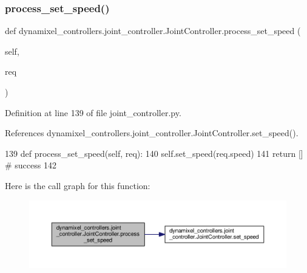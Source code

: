 \subsubsection{\texorpdfstring{process\+\_\+set\+\_\+speed()}{process\_set\_speed()}}
{\footnotesize\ttfamily def dynamixel\+\_\+controllers.\+joint\+\_\+controller.\+Joint\+Controller.\+process\+\_\+set\+\_\+speed (\begin{DoxyParamCaption}\item[{}]{self,  }\item[{}]{req }\end{DoxyParamCaption})\hspace{0.3cm}{\ttfamily [inherited]}}



Definition at line 139 of file joint\+\_\+controller.\+py.



References dynamixel\+\_\+controllers.\+joint\+\_\+controller.\+Joint\+Controller.\+set\+\_\+speed().


\begin{DoxyCode}
139     \textcolor{keyword}{def }process\_set\_speed(self, req):
140         self.set\_speed(req.speed)
141         \textcolor{keywordflow}{return} [] \textcolor{comment}{# success}
142 
\end{DoxyCode}
Here is the call graph for this function\+:
\nopagebreak
\begin{figure}[H]
\begin{center}
\leavevmode
\includegraphics[width=350pt]{d3/dcd/classdynamixel__controllers_1_1joint__controller_1_1_joint_controller_a97af096c1566307859ed168c900fa8a6_cgraph}
\end{center}
\end{figure}
\mbox{\label{classdynamixel__controllers_1_1joint__controller_1_1_joint_controller_aa199ce6ae353ed44fe71ae96a5da242d}} 
